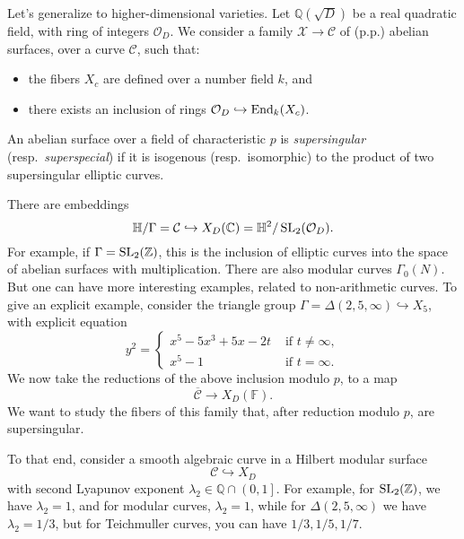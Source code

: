 \documentclass[reqno]{amsart} 
\begin{document}
Let's generalize to higher-dimensional varieties.  Let $\mathbb{Q}(\sqrt{D})$ be a real quadratic field, with ring of integers $\mathcal{O}_D$.  We consider a family $\mathcal{X} \rightarrow \mathcal{C}$ of (p.p.) abelian surfaces, over a curve $\mathcal{C}$, such that:
\begin{itemize}
\item the fibers $X_c$ are defined over a number field $k$, and
\item there exists an inclusion of rings $\mathcal{O}_D \hookrightarrow \operatorname{End}_k(X_c)$.
\end{itemize}
An abelian surface over a field of characteristic $p$ is \emph{supersingular} (resp.\ \emph{superspecial}) if it is isogenous (resp.\ isomorphic) to the product of two supersingular elliptic curves.

There are embeddings
\begin{equation*}
  \mathbb{H} / \Gamma = \mathcal{C} \hookrightarrow X_D(\mathbb{C}) = \mathbb{H}^2 / \operatorname{SL}_2(\mathcal{O}_D).
\end{equation*}
For example, if $\Gamma = \operatorname{SL}_2(\mathbb{Z})$, this is the inclusion of elliptic curves into the space of abelian surfaces with multiplication.  There are also modular curves $\Gamma_0(N)$.  But one can have more interesting examples, related to non-arithmetic curves.  To give an explicit example, consider the triangle group $\Gamma = \Delta(2, 5, \infty) \hookrightarrow X_5$, with explicit equation
\begin{equation*}
  y^2 =
  \begin{cases}
    x^5 - 5 x^3 + 5 x
    - 2 t
    & \text{ if } t \neq \infty, \\
    x^5 - 1    & \text{ if } t = \infty.
  \end{cases}
\end{equation*}
We now take the reductions of the above inclusion modulo $p$, to a map
\begin{equation*}
  \overline{\mathcal{C}} \rightarrow X_D(\mathbb{F}).
\end{equation*}
We want to study the fibers of this family that, after reduction modulo $p$, are supersingular.

To that end, consider a smooth algebraic curve in a Hilbert modular surface
\begin{equation*}
  \mathcal{C} \hookrightarrow X_D
\end{equation*}
with second Lyapunov exponent $\lambda_2 \in \mathbb{Q} \cap \left(0,1\right]$.  For example, for $\operatorname{SL}_2(\mathbb{Z})$, we have $\lambda_2 = 1$, and for modular curves, $\lambda_2 = 1$, while for
$\Delta(2, 5, \infty)$ we have $\lambda_2 = 1/3$, but for Teichmuller curves, you can have $1/3, 1/5, 1/7$.
\end{document}
